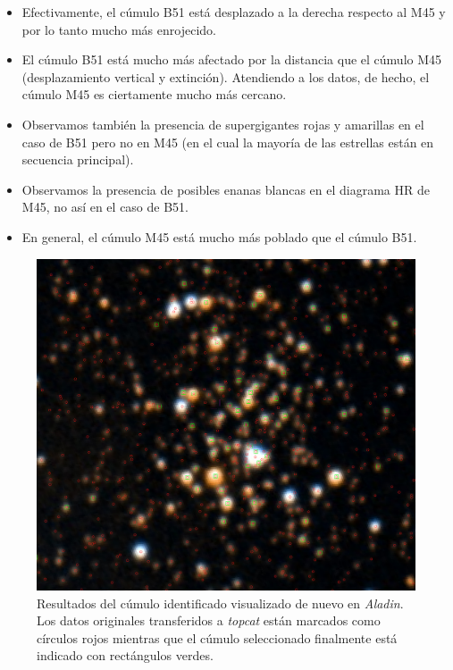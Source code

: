 \documentclass[a4paper,fleqn,usenatbib]{mnras}
\begin{document}
\begin{itemize}
  \item Efectivamente, el cúmulo B51 está desplazado a la derecha respecto al M45 y por lo tanto mucho más enrojecido.
  \item El cúmulo B51 está mucho más afectado por la distancia que el cúmulo M45 (desplazamiento vertical y extinción). Atendiendo a los datos, de hecho, el cúmulo M45 es ciertamente mucho más cercano.
  \item Observamos también la presencia de supergigantes rojas y amarillas en el caso de B51 pero no en M45 (en el cual la mayoría de las estrellas están en secuencia principal).
  \item Observamos la presencia de posibles enanas blancas en el diagrama HR de M45, no así en el caso de B51.
  \item En general, el cúmulo M45 está mucho más poblado que el cúmulo B51.
\end{itemize}

\newpage

\begin{figure}
  \includegraphics[width=\linewidth]{img/b51_aladin}
  \caption{Resultados del cúmulo identificado visualizado de nuevo en \emph{Aladin}. Los datos originales transferidos a \emph{topcat} están marcados como círculos rojos mientras que el cúmulo seleccionado finalmente está indicado con rectángulos verdes.}
  \label{fig:e2_b51_aladin}
\end{figure}
\end{document}
